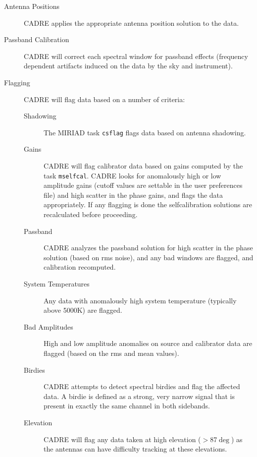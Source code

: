 \begin{description}
\item[Antenna Positions] CADRE applies the appropriate antenna position solution to the data.
\item[Passband Calibration] CADRE will correct each spectral window for passband effects (frequency dependent artifacts induced on the data by the sky and instrument).
\item[Flagging] CADRE will flag data based on a number of criteria:
\begin{description}
\item[Shadowing] The MIRIAD task \verb#csflag# flags data based on antenna shadowing.
\item[Gains] CADRE will flag calibrator data based on gains computed by the task \verb#mselfcal#. CADRE looks for anomalously high or low amplitude gains (cutoff values are settable in the user preferences file) and high scatter in the phase gains, and flags the data appropriately. If any flagging is done the selfcalibration solutions are recalculated before proceeding.
\item[Passband] CADRE analyzes the passband solution for high scatter in the phase solution (based on rms noise), and any bad windows are flagged, and calibration recomputed.
\item[System Temperatures] Any data with anomalously high system temperature (typically above 5000K) are flagged.
\item[Bad Amplitudes] High and low amplitude anomalies on source and calibrator data are flagged (based on the rms and mean values).
\item[Birdies] CADRE attempts to detect spectral birdies and flag the affected data. A birdie is defined as a strong, very narrow signal that is present in exactly the same channel in both sidebands.
\item[Elevation] CADRE will flag any data taken at high elevation ($>$87$\deg$) as the antennas can have difficulty tracking at these elevations.

\end{description}
\end{description}
